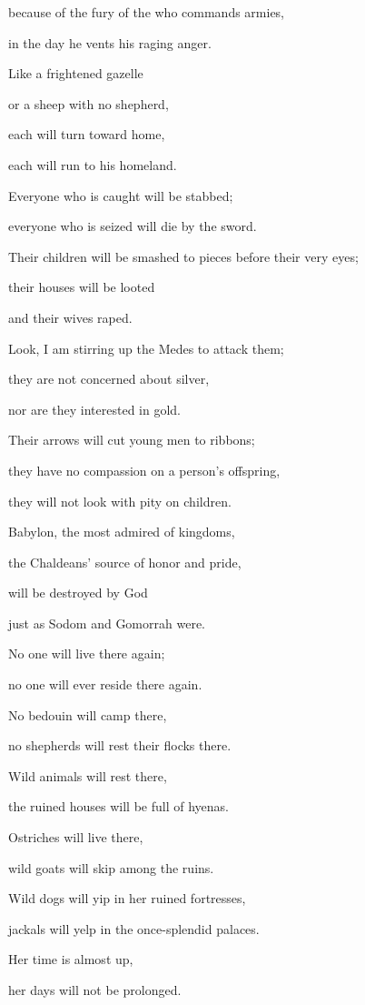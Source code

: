 {\par }{\Q because of the fury
of the {}
who commands armies,
\par }{\Q in the day
he vents his raging
anger.
\par }{\Q {}Like a frightened gazelle
\par }{\Q or a sheep
with no
shepherd,
\par }{\Q each
will turn toward home,
\par }{\Q each
will run
to
his homeland.
\par }{\Q {}Everyone
who
is caught
will be stabbed;
\par }{\Q everyone
who is seized will
die
by the sword.
\par }{\Q {}Their children
will be smashed
to pieces before their very eyes;
\par }{\Q their houses
will be looted
\par }{\Q and their wives
raped.
\par }{\Q {}Look,
I am stirring
up the Medes
to attack them;

\par }{\Q they are not concerned about
silver,
\par }{\Q nor are they interested
in gold.
\par }{\Q {}Their arrows
will cut young men
to ribbons;
\par }{\Q they have no compassion on
a person’s offspring,
\par }{\Q they will not
look
with pity
on
children.
\par }{\Q {}Babylon,
the most admired
of kingdoms,
\par }{\Q the Chaldeans’
source of honor
and pride,
\par }{\Q will be destroyed
by God
\par }{\Q just as Sodom
and Gomorrah were.
\par }{\Q {}No one
will live
there again;
\par }{\Q no one
will ever
reside
there again.
\par }{\Q No
bedouin
will camp
there,
\par }{\Q no
shepherds
will rest
their flocks there.
\par }{\Q {}Wild animals
will rest
there,
\par }{\Q the ruined houses
will be full
of hyenas.
\par }{\Q Ostriches
will live
there,
\par }{\Q wild goats
will skip among the ruins.
\par }{\Q {}Wild dogs
will yip
in her ruined fortresses,
\par }{\Q jackals
will yelp in the once-splendid
palaces.
\par }{\Q Her time
is almost
up,
\par }{\Q her days
will not
be prolonged.


}
